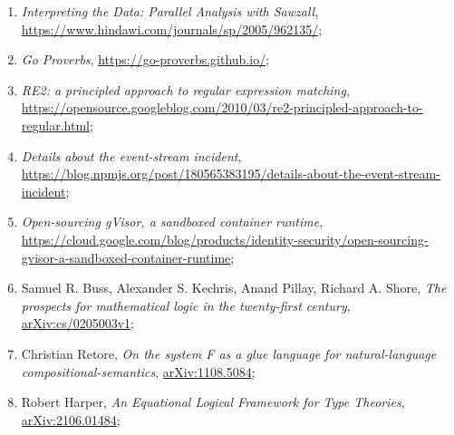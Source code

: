 \documentclass[a4paper,11pt]{article}
\begin{document}
\begin{enumerate}
\item \textit{Interpreting the Data: Parallel Analysis with Sawzall},
  \href{https://www.hindawi.com/journals/sp/2005/962135/}{https://www.hindawi.com/journals/sp/2005/962135/};



\item \textit{Go Proverbs},
  \href{https://go-proverbs.github.io/}{https://go-proverbs.github.io/};



\item \textit{RE2: a principled approach to regular expression
    matching}, \\
  \href{https://opensource.googleblog.com/2010/03/re2-principled-approach-to-regular.html}{https://opensource.googleblog.com/2010/03/re2-principled-approach-to-regular.html};



\item \textit{Details about the event-stream incident}, \\
  \href{https://blog.npmjs.org/post/180565383195/details-about-the-event-stream-incident}{https://blog.npmjs.org/post/180565383195/details-about-the-event-stream-incident};



\item \textit{Open-sourcing gVisor, a sandboxed container runtime}, \\
  \href{https://cloud.google.com/blog/products/identity-security/open-sourcing-gvisor-a-sandboxed-container-runtime}{https://cloud.google.com/blog/products/identity-security/open-sourcing-gvisor-a-sandboxed-container-runtime};



\item Samuel R. Buss, Alexander S. Kechris, Anand Pillay, Richard A.
  Shore, \textit{The prospects for mathematical logic in the
    twenty-first century},
  \href{https://arxiv.org/abs/cs/0205003v1}{arXiv:cs/0205003v1};



\item Christian Retore, \textit{On the system F as a glue language for
    natural-language compositional-semantics},
  \href{https://arxiv.org/abs/1108.5084}{arXiv:1108.5084};



\item Robert Harper, \textit{An Equational Logical Framework for Type
    Theories},
  \href{https://arxiv.org/abs/2106.01484}{arXiv:2106.01484};




\end{enumerate}
\end{document}
